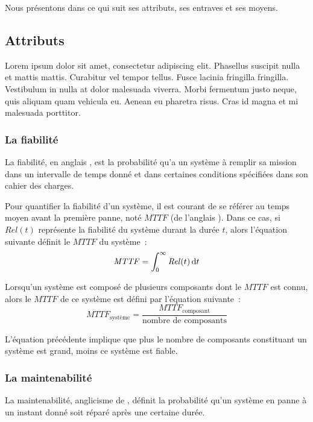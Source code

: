 Nous présentons dans ce qui suit ses attributs, ses entraves et ses moyens.

\subsection{Attributs}
Lorem ipsum dolor sit amet, consectetur adipiscing elit. Phasellus suscipit nulla et mattis mattis. Curabitur vel tempor tellus. 
Fusce lacinia fringilla fringilla. Vestibulum in nulla at dolor malesuada viverra. Morbi fermentum justo neque, quis aliquam quam vehicula eu. 
Aenean eu pharetra risus. Cras id magna et mi malesuada porttitor.

\subsubsection{La fiabilité}
La fiabilité, en anglais , est la probabilité qu'a un système à remplir sa mission
dans un intervalle de temps donné et dans certaines conditions spécifiées dans
son cahier des charges.

Pour quantifier la fiabilité d'un système, il est courant de se référer
au temps moyen avant la première panne, noté $\mathit{MTTF}$ (de l'anglais ).
Dans ce cas, si $\mathit{Rel}(t)$ représente la fiabilité du système durant
la durée $t$, alors l'équation suivante définit le $\mathit{MTTF}$ du système~:
\begin{equation}
\mathit{MTTF} = \int_{0}^{\infty} \mathit{Rel}(t) \mathop{}\!\mathrm{d} t
\end{equation}

Lorsqu'un système est composé de plusieurs composants dont le $\mathit{MTTF}$ est
connu, alors le $\mathit{MTTF}$ de ce système est défini par l'équation suivante~:
\begin{equation}
\mathit{MTTF}_\text{système} = \frac{\mathit{MTTF}_\text{composant}}{\text{nombre~de~composants}}
\end{equation}

L'équation précédente implique que plus le nombre de composants constituant un système est grand, moins ce système
est fiable.

\subsubsection{La maintenabilité}
La maintenabilité, anglicisme de , définit la probabilité qu'un
système en panne à un instant donné soit réparé après une certaine durée.

